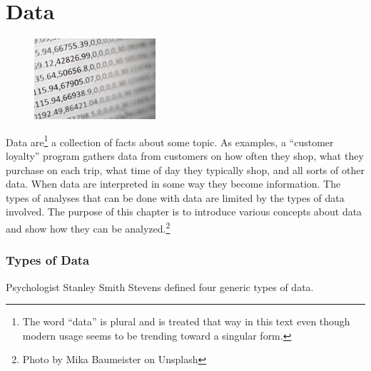 \chapter{Data}\label{06:data}

\begin{figure}
	\label{06:fig01} 
	\centering
	\includegraphics[width=0.4\textwidth]{gfx/06-data} 
\end{figure}
Data are\footnote{The word ``data'' is plural and is treated that way in this text even though modern usage seems to be trending toward a singular form.} a collection of facts about some topic. As examples, a ``customer loyalty'' program gathers data from customers on how often they shop, what they purchase on each trip, what time of day they typically shop, and all sorts of other data. When data are interpreted in some way they become information. The types of analyses that can be done with data are limited by the types of data involved. The purpose of this chapter is to introduce various concepts about data and show how they can be analyzed.\footnote{Photo by Mika Baumeister on Unsplash}

\subsection{Types of Data}

Psychologist Stanley Smith Stevens defined four generic types of data\cite{stevens1946theory}. 

